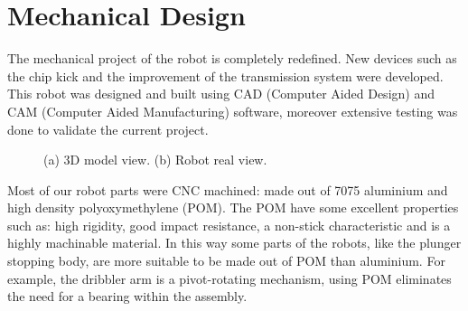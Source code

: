 \section{Mechanical Design}

The mechanical project of the robot is completely redefined. New devices such as the chip kick and the improvement of the transmission system were developed. This robot was designed and built using CAD (Computer Aided Design) and CAM (Computer Aided Manufacturing) software, moreover extensive testing was done to validate the current project.

\begin{figure}[thpb]
	\centering
	\caption{(a) 3D model view. (b) Robot real view.}
	\label{mec1}
\end{figure}

Most of our robot parts were CNC machined: made out of 7075 aluminium and high density polyoxymethylene (POM). The POM have some excellent properties such as: high rigidity, good impact resistance,
a non-stick characteristic and is a highly machinable material. In this way some parts of the robots, like the plunger stopping body, are more suitable to be made out of POM than aluminium. For example, the dribbler arm is a pivot-rotating mechanism, using POM eliminates the need for a bearing within the assembly.

